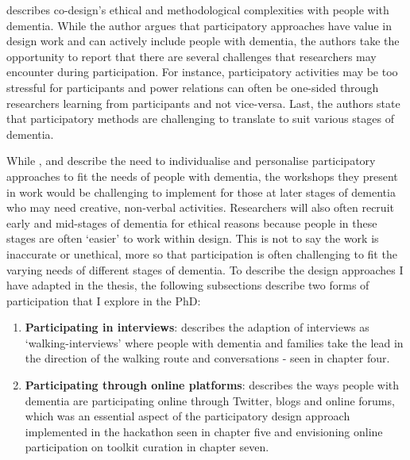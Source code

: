 \cite{hendriks_challenges_2014} describes co-design's ethical and methodological complexities with people with dementia. While the author argues that participatory approaches have value in design work and can actively include people with dementia, the authors take the opportunity to report that there are several challenges that researchers may encounter during participation. For instance, participatory activities may be too stressful for participants and power relations can often be one-sided through researchers learning from participants and not vice-versa. Last, the authors state that participatory methods are challenging to translate to suit various stages of dementia.

While \cite{lindsay_empathy_2012}, and \cite{stenhouse2013dangling} describe the need to individualise and personalise participatory approaches to fit the needs of people with dementia, the workshops they present in work would be challenging to implement for those at later stages of dementia who may need creative, non-verbal activities. Researchers will also often recruit early and mid-stages of dementia for ethical reasons because people in these stages are often ‘easier’ to work within design. This is not to say the work is inaccurate or unethical, more so that participation is often challenging to fit the varying needs of different stages of dementia. To describe the design approaches I have adapted in the thesis, the following subsections describe two forms of participation that I explore in the PhD: 
\begin{enumerate}

\item \textbf{Participating in interviews}: describes the adaption of interviews as `walking-interviews' where people with dementia and families take the lead in the direction of the walking route and conversations
- seen in chapter four.

\item \textbf{Participating through online platforms}: describes the ways people with dementia are participating online through Twitter, blogs and online forums, which was an essential aspect of the participatory design approach implemented in the hackathon seen in chapter five and envisioning online participation on toolkit curation in chapter seven.
\end{enumerate}

